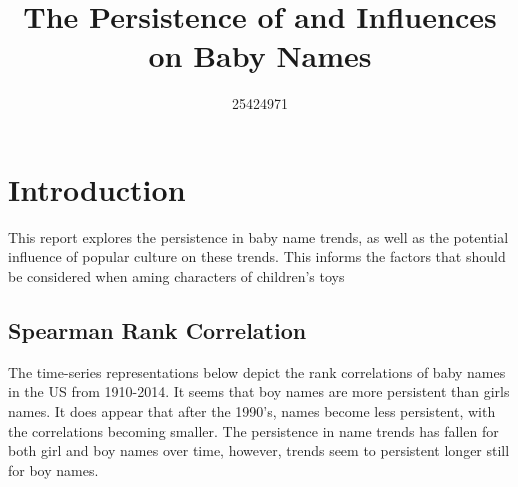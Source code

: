\documentclass[11pt,preprint]{elsarticle}
\numberwithin{equation}{section}
\numberwithin{figure}{section}
\numberwithin{table}{section}
\begin{document}
\begin{frontmatter}  %

\title{The Persistence of and Influences on Baby Names}





\author[Add1]{25424971}








\vspace{1cm}





\vspace{0.5cm}

\end{frontmatter}

\setcounter{footnote}{0}



\pagestyle{fancy}
\chead{}
\rhead{}
\lfoot{}
\lhead{}
\cfoot{}


\headsep 35pt %




\section{Introduction}\label{introduction}

This report explores the persistence in baby name trends, as well as the
potential influence of popular culture on these trends. This informs the
factors that should be considered when aming characters of children's
toys

\subsection{Spearman Rank Correlation}\label{spearman-rank-correlation}

The time-series representations below depict the rank correlations of
baby names in the US from 1910-2014. It seems that boy names are more
persistent than girls names. It does appear that after the 1990's, names
become less persistent, with the correlations becoming smaller. The
persistence in name trends has fallen for both girl and boy names over
time, however, trends seem to persistent longer still for boy names.
\end{document}
